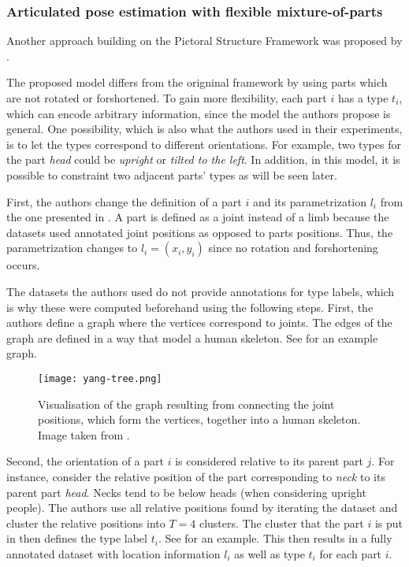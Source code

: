 \subsubsection{Articulated pose estimation with flexible mixture-of-parts}
\label{sec:yangramanan}
Another approach building on the Pictoral Structure Framework was proposed by \cite{yang_articulated_2011}.

The proposed model differs from the origninal framework by using parts which are not rotated or forshortened.
To gain more flexibility, each part $i$ has a type $t_i$, which can encode arbitrary information, since the model the authors propose is general.
One possibility, which is also what the authors used in their experiments, is to let the types correspond to different orientations.
For example, two types for the part \textit{head} could be \textit{upright} or \textit{tilted to the left}.
In addition, in this model, it is possible to constraint two adjacent parts' types as will be seen later.

First, the authors change the definition of a part $i$ and its parametrization $l_i$ from the one presented in \cite{felzenszwalb_pictorial_2005}.
A part is defined as a joint instead of a limb because the datasets used annotated joint positions as opposed to parts positions.
Thus, the parametrization changes to $l_i = (x_i, y_i)$ since no rotation and forshortening occurs.

The datasets the authors used do not provide annotations for type labels, which is why these were computed beforehand using the following steps.
First, the authors define a graph where the vertices correspond to joints.
The edges of the graph are defined in a way that model a human skeleton.
See  for an example graph.

\begin{figure}[htb!]
    \centering
    \texttt{[image: yang-tree.png]}
    \caption{Visualisation of the graph resulting from connecting the joint positions, which form the vertices, together into a human skeleton. Image taken from \cite{yang_articulated_2011}.}
    \label{fig:yang-tree}
\end{figure}

Second, the orientation of a part $i$ is considered relative to its parent part $j$.
For instance, consider the relative position of the part corresponding to \textit{neck} to its parent part \textit{head}.
Necks tend to be below heads (when considering upright people).
The authors use all relative positions found by iterating the dataset and cluster the relative positions into $T=4$ clusters.
The cluster that the part $i$ is put in then defines the type label $t_i$.
See  for an example.
This then results in a fully annotated dataset with location information $l_i$ as well as type $t_i$ for each part $i$.


